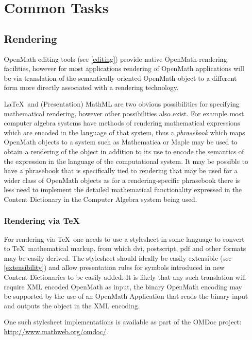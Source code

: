 \documentclass[keylogo]{openmath}
\begin{document}
\section{Common Tasks}

\subsection{Rendering}
OpenMath editing tools (see \ref{editing})  provide native
OpenMath rendering facilities, however for most applications
rendering of OpenMath applications will be via translation of the
semantically oriented OpenMath object to a different form more
directly associated with a rendering technology.

\LaTeX\ and (Presentation) MathML are two obvious possibilities for
specifying mathematical rendering, however other possibilities also
exist. For example most computer algebra systems have methods of
rendering mathematical expressions which are encoded in the language
of that system, thus a \emph{phrasebook} which maps OpenMath objects
to a system such as Mathematica or Maple may be used to obtain a
rendering of the object in addition to its use to encode the semantics
of the expression in the language of the computational system. It may
be possible to have a phrasebook that is specifically tied to
rendering that may be used for a wider class of OpenMath objects as
for a rendering-specific phrasebook there is less need to implement
the detailed mathematical functionality expressed in the Content
Dictionary in the Computer Algebra system being used.

\subsubsection{Rendering via \TeX}


For rendering via \TeX\ one needs to use a stylesheet in some language
to convert to \TeX\ mathematical markup, from which dvi, postscript,
pdf and other formats may be easily derived. The stylesheet should
ideally be easily extensible (see \ref{extensibility}) and allow
presentation rules for symbols introduced in new Content Dictionaries
to be easily added. It is likely that any such translation  will require
XML encoded OpenMath as input, the binary OpenMath encoding may be
supported by the use of an OpenMath Application that reads the binary
input and outputs the object in the XML encoding.

One such stylesheet implementations is available as part of the OMDoc
project: \url{http://www.mathweb.org/omdoc/}. 
\end{document}

